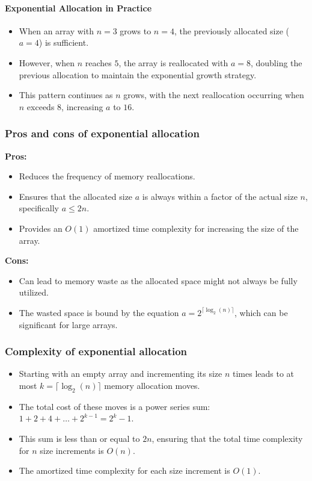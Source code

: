 \documentclass[12pt]{article}
\begin{document}
\paragraph{Exponential Allocation in Practice}
\begin{itemize}
    \item When an array with \( n = 3 \) grows to \( n = 4 \), the previously allocated size (\( a = 4 \)) is sufficient.
    \item However, when \( n \) reaches \( 5 \), the array is reallocated with \( a = 8 \), doubling the previous allocation to maintain the exponential growth strategy.
    \item This pattern continues as \( n \) grows, with the next reallocation occurring when \( n \) exceeds \( 8 \), increasing \( a \) to \( 16 \).
\end{itemize}

\subsubsection{Pros and cons of exponential allocation}

\textbf{Pros:}
\begin{itemize}
    \item Reduces the frequency of memory reallocations.
    \item Ensures that the allocated size \( a \) is always within a factor of the actual size \( n \), specifically \( a \leq 2n \).
    \item Provides an \( O(1) \) amortized time complexity for increasing the size of the array.
\end{itemize}

\textbf{Cons:}
\begin{itemize}
    \item Can lead to memory waste as the allocated space might not always be fully utilized.
    \item The wasted space is bound by the equation \( a = 2^{\lceil \log_2(n) \rceil} \), which can be significant for large arrays.
\end{itemize}



\subsubsection{Complexity of exponential allocation}
\begin{itemize}
    \item Starting with an empty array and incrementing its size \( n \) times leads to at most \( k = \lceil \log_2(n) \rceil \) memory allocation moves.
    \item The total cost of these moves is a power series sum: \( 1 + 2 + 4 + \ldots + 2^{k-1} = 2^k - 1 \).
    \item This sum is less than or equal to \( 2n \), ensuring that the total time complexity for \( n \) size increments is \( O(n) \).
    \item The amortized time complexity for each size increment is \( O(1) \).
\end{itemize}
\end{document}
